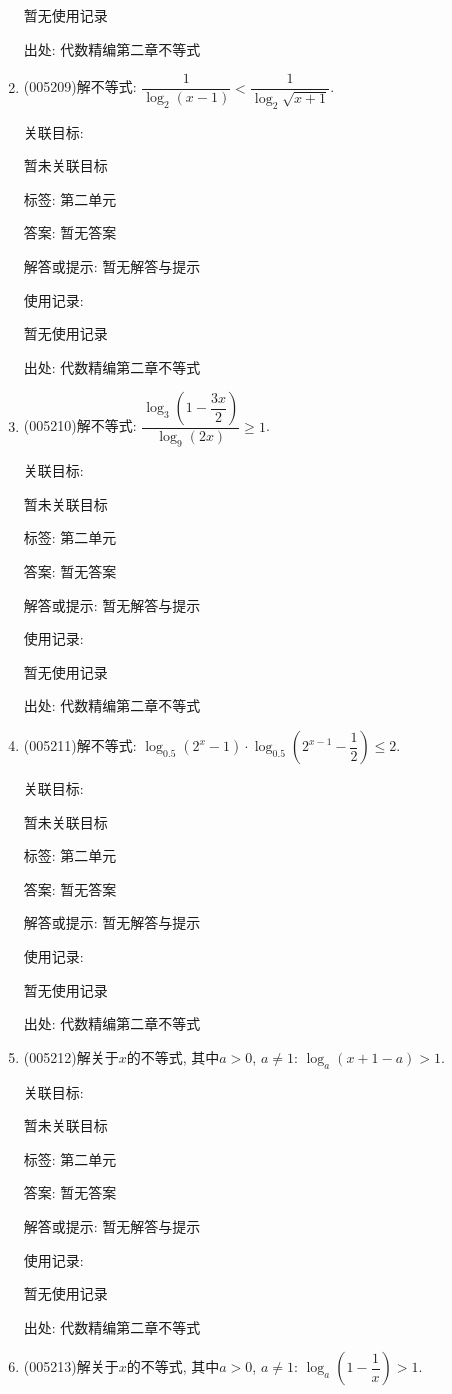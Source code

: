 \documentclass[10pt,a4paper]{article}
\begin{document}
\begin{enumerate}[1.]
暂无使用记录


出处: 代数精编第二章不等式
\item { (005209)}解不等式: $\dfrac 1{\log_2(x-1)}<\dfrac 1{\log_2\sqrt{x+1}}$.


关联目标:

暂未关联目标



标签: 第二单元

答案: 暂无答案

解答或提示: 暂无解答与提示

使用记录:

暂无使用记录


出处: 代数精编第二章不等式
\item { (005210)}解不等式: $\dfrac{\log_3(1-\dfrac{3x}2)}{\log_9(2x)}\ge 1$.


关联目标:

暂未关联目标



标签: 第二单元

答案: 暂无答案

解答或提示: 暂无解答与提示

使用记录:

暂无使用记录


出处: 代数精编第二章不等式
\item { (005211)}解不等式: $\log_{0.5}({2^x}-1)\cdot \log_{0.5}({2^{x-1}}-\dfrac 12)\le 2$.


关联目标:

暂未关联目标



标签: 第二单元

答案: 暂无答案

解答或提示: 暂无解答与提示

使用记录:

暂无使用记录


出处: 代数精编第二章不等式
\item { (005212)}解关于$x$的不等式, 其中$a>0$, $a\ne 1$: $\log_a(x+1-a)>1$.


关联目标:

暂未关联目标



标签: 第二单元

答案: 暂无答案

解答或提示: 暂无解答与提示

使用记录:

暂无使用记录


出处: 代数精编第二章不等式
\item { (005213)}解关于$x$的不等式, 其中$a>0$, $a\ne 1$: $\log_a(1-\dfrac 1x)>1$.



\end{enumerate}
\end{document}
